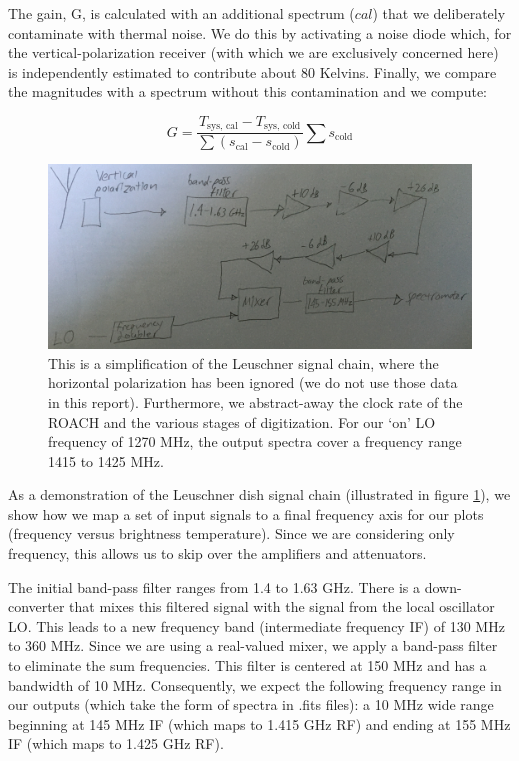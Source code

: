 \documentclass[12pt]{article}
\begin{document}
The gain, G, is calculated with an additional spectrum ($cal$) that we deliberately contaminate with thermal noise. We do this by activating a noise diode which, for the vertical-polarization receiver (with which we are exclusively concerned here) is independently estimated to contribute about 80 Kelvins. Finally, we compare the magnitudes with a spectrum without this contamination and we compute:

\begin{equation} \label{eq:line_gain}
G = \frac{T_\text{sys, cal} - T_\text{sys, cold}}{\sum{(s_\text{cal} - s_\text{cold})}} \sum{s_\text{cold}}
\end{equation}

\begin{figure}
	\centering
	\includegraphics[width=.9\linewidth]{sig_chain}
	\caption{This is a simplification of the Leuschner signal chain, where the horizontal polarization has been ignored (we do not use those data in this report). Furthermore, we abstract-away the clock rate of the ROACH and the various stages of digitization. For our `on' LO frequency of 1270 MHz, the output spectra cover a frequency range 1415 to 1425 MHz.}
	\label{fig:sig_chain}
\end{figure}

As a demonstration of the Leuschner dish signal chain (illustrated in figure \ref{fig:sig_chain}), we show how we map a set of input signals to a final frequency axis for our plots (frequency versus brightness temperature). Since we are considering only frequency, this allows us to skip over the amplifiers and attenuators.

The initial band-pass filter ranges from 1.4 to 1.63 GHz. There is a down-converter that mixes this filtered signal with the signal from the local oscillator LO. This leads to a new frequency band (intermediate frequency IF) of 130 MHz to 360 MHz. Since we are using a real-valued mixer, we apply a band-pass filter to eliminate the sum frequencies. This filter is centered at 150 MHz and has a bandwidth of 10 MHz. Consequently, we expect the following frequency range in our outputs (which take the form of spectra in .fits files): a 10 MHz wide range beginning at 145 MHz IF (which maps to 1.415 GHz RF) and ending at 155 MHz IF (which maps to 1.425 GHz RF).
\end{document}
